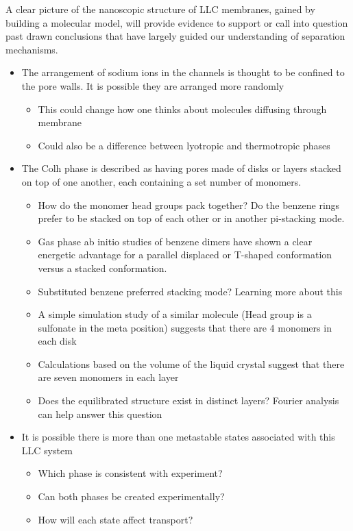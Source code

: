 \documentclass{article}
\begin{document}
	A clear picture of the nanoscopic structure of LLC membranes, gained by building a molecular model, 
will provide evidence to support or call into question past drawn conclusions that have largely guided our understanding of separation mechanisms. 
	\begin{itemize}
		\item The arrangement of sodium ions in the channels is thought to be confined to the pore walls. It is possible they are arranged more randomly
		\begin{itemize}
			\item This could change how one thinks about molecules diffusing through membrane
			\item Could also be a difference between lyotropic and thermotropic phases
		\end{itemize}
		\item The Colh phase is described as having pores made of disks or layers stacked on top of one another, each containing a set number of monomers. 
		\begin{itemize}
			\item How do the monomer head groups pack together? Do the benzene rings prefer to be stacked on top of each other or in another pi-stacking mode.
			\item Gas phase ab initio studies of benzene dimers have shown a clear energetic advantage for a parallel displaced or T-shaped conformation versus a stacked conformation. 
			\item Substituted benzene preferred stacking mode? Learning more about this   	
			\item A simple simulation study of a similar molecule (Head group is a sulfonate in the meta position) suggests that there are 4 monomers in each disk
			\item Calculations based on the volume of the liquid crystal suggest that there are seven monomers in each layer 
			\item Does the equilibrated structure exist in distinct layers? Fourier analysis can help answer this question
		\end{itemize}
		\item It is possible there is more than one metastable states associated with this LLC system
		\begin{itemize}
			\item Which phase is consistent with experiment?
			\item Can both phases be created experimentally?
			\item How will each state affect transport?
		\end{itemize}
	\end{itemize}
	
\end{document}
